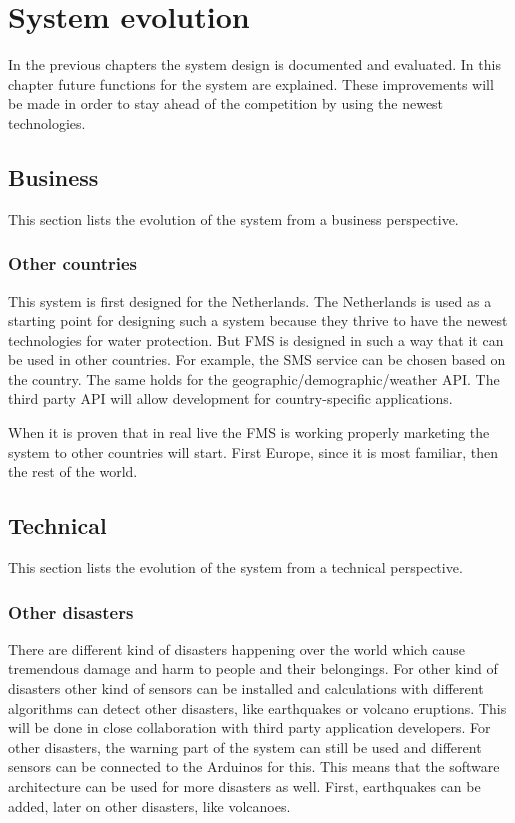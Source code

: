\chapter{System evolution}

\label{ch:evolution}
In the previous chapters the system design is documented and evaluated. In this chapter future functions for the system are explained. These improvements will be made in order to stay ahead of the competition by using the newest technologies.

\section{Business}
This section lists the evolution of the system from a business perspective.

\subsection{Other countries}
This system is first designed for the Netherlands. The Netherlands is used as a starting point for designing such a system because they thrive to have the newest technologies for water protection. But FMS is designed in such a way that it can be used in other countries. For example, the SMS service can be chosen based on the country. The same holds for the geographic/demographic/weather API.
The third party API will allow development for country-specific applications.

When it is proven that in real live the FMS is working properly marketing the system to other countries will start. First Europe, since it is most familiar, then the rest of the world.


\section{Technical}
This section lists the evolution of the system from a technical perspective.
\subsection{Other disasters}
There are different kind of disasters happening over the world which cause tremendous damage and harm to people and their belongings. For other kind of disasters other kind of sensors can be installed and calculations with different algorithms can detect other disasters, like earthquakes or volcano eruptions. This will be done in close collaboration with third party application developers.
For other disasters, the warning part of the system can still be used and different sensors can be connected to the Arduinos for this. This means that the software architecture can be used for more disasters as well.
First, earthquakes can be added, later on other disasters, like volcanoes.

